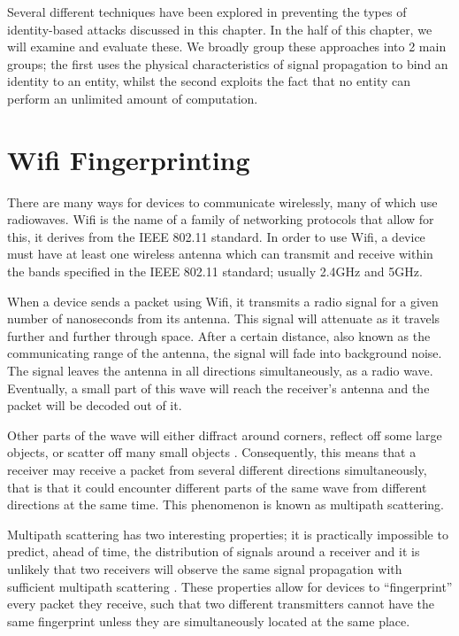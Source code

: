 \noindent\makebox[\linewidth]{\rule{\textwidth}{1pt}}


Several different techniques have been explored in preventing the types of identity-based attacks discussed in this chapter. In the  half of this chapter, we will examine and evaluate these. We broadly group these approaches into 2 main groups; the first uses the physical characteristics of signal propagation to bind an identity to an entity, whilst the second exploits the fact that no entity can perform an unlimited amount of computation.

\section{Wifi Fingerprinting}

There are many ways for devices to communicate wirelessly, many of which use radiowaves. Wifi is the name of a family of networking protocols that allow for this, it derives from the IEEE 802.11 standard. In order to use Wifi, a device must have at least one wireless antenna which can transmit and receive within the bands specified in the IEEE 802.11 standard; usually 2.4GHz and 5GHz.

When a device sends a packet using Wifi, it transmits a radio signal for a given number of nanoseconds from its antenna. This signal will attenuate as it travels further and further through space. After a certain distance, also known as the communicating range of the antenna, the signal will fade into background noise. The signal leaves the antenna in all directions simultaneously, as a radio wave. Eventually, a small part of this wave will reach the receiver's antenna and the packet will be decoded out of it.

Other parts of the wave will either diffract around corners, reflect off some large objects, or scatter off many small objects \cite{SignalProp}. Consequently, this means that a receiver may receive a packet from several different directions simultaneously, that is that it could encounter different parts of the same wave from different directions at the same time. This phenomenon is known as multipath scattering. %

Multipath scattering has two interesting properties; it is practically impossible to predict, ahead of time, the distribution of signals around a receiver and it is unlikely that two receivers will observe the same signal propagation with sufficient multipath scattering \citationneeded. These properties allow for devices to ``fingerprint'' every packet they receive, such that two different transmitters cannot have the same fingerprint unless they are simultaneously located at the same place. 

